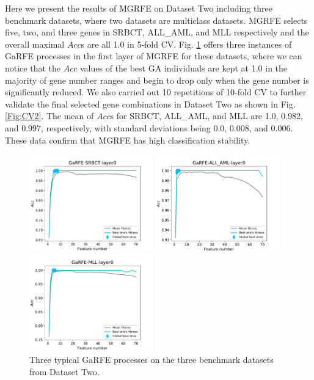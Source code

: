 \documentclass[10pt,journal,compsoc]{IEEEtran}
\begin{document}
	Here we present the results of MGRFE on Dataset Two including three benchmark datasets, where two datasets are multiclass datasets. MGRFE selects five, two, and three genes in SRBCT, ALL\_AML, and MLL respectively and the overall maximal \(Acc\)s are all 1.0 in 5-fold CV. Fig. \ref{Fig:3 RFE on benchmarks} offers three instances of GaRFE processes in the first layer of MGRFE for these datasets, where we can notice that the \(Acc\) values of the best GA individuals are kept at 1.0 in the majority of gene number ranges and begin to drop only when the gene number is significantly reduced. We also carried out 10 repetitions of 10-fold CV to further validate the final selected gene combinations in Dataset Two as shown in Fig. \ref{Fig:CV2}. The mean of \(Acc\)s for SRBCT, ALL\_AML, and MLL are 1.0, 0.982, and 0.997, respectively, with standard deviations being 0.0, 0.008, and 0.006. These data confirm that MGRFE has high classification stability.
	
	\begin{figure}[!htbp]
		\begin{minipage}[t]{0.3\textwidth}
			\centering
			\includegraphics[height=1.65in]{pictures/SRBCT-RFE.pdf}
		\end{minipage}
		\begin{minipage}[t]{0.3\textwidth}
			\centering
			\includegraphics[height=1.65in]{pictures/ALLAML-RFE.pdf}
		\end{minipage}
		\begin{minipage}[t]{0.3\textwidth}
			\centering
			\includegraphics[height=1.65in]{pictures/MLL-RFE.pdf}
		\end{minipage}
		\caption{Three typical GaRFE processes on the three benchmark datasets from Dataset Two.}
		\label{Fig:3 RFE on benchmarks}
	\end{figure}
	
\end{document}
